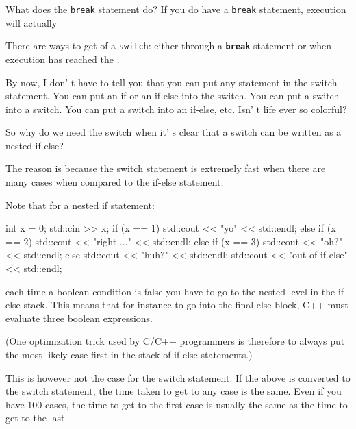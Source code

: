 What does the \texttt{break} statement do? If you do  have a
\texttt{break} statement, execution will actually 

There are  ways to get  of a \texttt{switch}:
either through a \texttt{\textbf{break}} statement or when execution has
reached the .

By now, I don' t have to tell you that you can put any
statement in the switch statement. You can put an if or an if-else into
the switch. You can put a switch into a switch. You can put a switch
into an if-else, etc. Isn' t life ever so colorful?

\newpage{}

So why do we need the switch when it' s clear that a
switch can be written as a nested if-else?

The reason is because the switch statement is extremely fast when there
are many cases when compared to the if-else statement.

Note that for a nested if statement:
\begin{console}
int x = 0;
std::cin >> x;
if (x == 1)
{
     std::cout << "yo" << std::endl;
}
else if (x == 2)
{
     std::cout << "right ..." << std::endl;
}
else if (x == 3)
{
     std::cout << "oh?" << std::endl;
}
else
{
     std::cout << "huh?" << std::endl;
}
std::cout << "out of if-else" << std::endl;
\end{console}

each time a boolean condition is false you have to go to the nested
level in the if-else stack. This means that for instance to go into the
final else block, C++ must evaluate three boolean expressions.

(One optimization trick used by C/C++ programmers is therefore to always
put the most likely case first in the stack of if-else statements.)

This is however not the case for the switch statement. If the above is
converted to the switch statement, the time taken to get to any case is
the same. Even if you have 100 cases, the time to get to the first case
is usually the same as the time to get to the last.

\newpage{}

